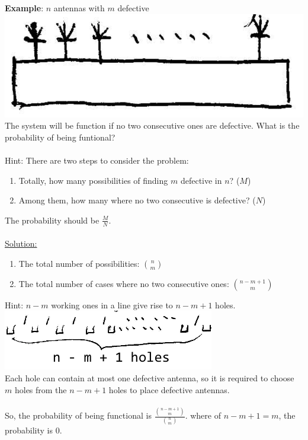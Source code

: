\documentclass[11pt, letterpaper]{article}
\begin{document}
\noindent
\textbf{Example}: $n$ antennas with $m$ defective \\
\includegraphics{1-2} \\
The system will be function if no two consecutive ones are defective. What is the probability of being funtional? \\ \\
Hint: There are two steps to consider the problem:
\begin{enumerate}
  \item Totally, how many possibilities of finding $m$ defective in $n$? ($M$)
  \item Among them, how many where no two consecutive is defective? ($N$)
\end{enumerate}
The probability should be $\frac{M}{N}$. \\ \\
\underline{Solution:}
\begin{enumerate}
  \item The total number of possibilities: $\binom{n}{m}$
  \item The total number of cases where no two consecutive ones: $\binom{n-m+1}{m}$
\end{enumerate}
Hint: $n-m$ working ones in a line give rise to $n-m+1$ holes. \\
\includegraphics{1-3} \\
Each hole can contain at most one defective antenna, so it is required to choose $m$ holes from the $n-m+1$ holes to place defective antennas. \\ \\
So, the probability of being functional is $\frac{\binom{n-m+1}{m}}{\binom{n}{m}}$. where of $n-m+1 = m$, the probability is 0. \\ \\
\end{document}
